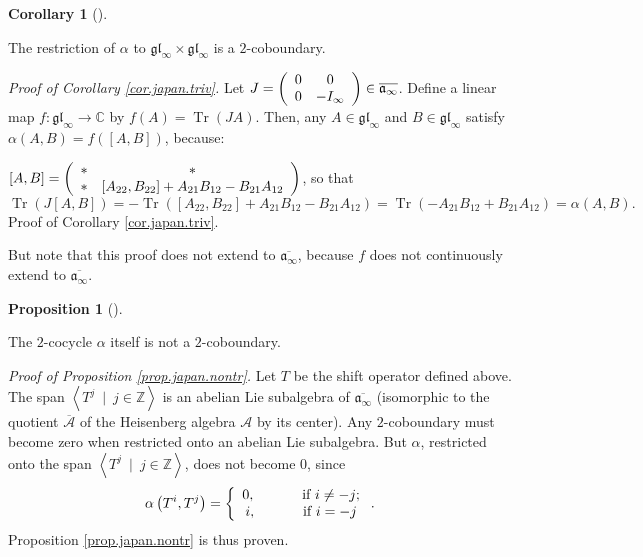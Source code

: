 \documentclass
[numbers=enddot,12pt,final,onecolumn,german,notitlepage]{scrartcl}%
\theoremstyle{definition}
\newtheorem{prop}[theo]{Proposition}
\newenvironment{proposition}[1][]
{\begin{prop}[#1]\begin{leftbar}}
{\end{leftbar}\end{prop}}
\newtheorem{coro}[theo]{Corollary}
\newenvironment{corollary}[1][]
{\begin{coro}[#1]\begin{leftbar}}
{\end{leftbar}\end{coro}}
\begin{document}
\begin{corollary}
\label{cor.japan.triv}The restriction of $\alpha$ to $\mathfrak{gl}_{\infty
}\times\mathfrak{gl}_{\infty}$ is a $2$-coboundary.
\end{corollary}

\textit{Proof of Corollary \ref{cor.japan.triv}.} Let $J=\left(
\begin{array}
[c]{cc}%
0 & 0\\
0 & -I_{\infty}%
\end{array}
\right)  \in\overline{\mathfrak{a}_{\infty}}$. Define a linear map
$f:\mathfrak{gl}_{\infty}\rightarrow\mathbb{C}$ by $f\left(  A\right)
=\operatorname*{Tr}\left(  JA\right)  $. Then, any $A\in\mathfrak{gl}_{\infty
}$ and $B\in\mathfrak{gl}_{\infty}$ satisfy $\alpha\left(  A,B\right)
=f\left(  \left[  A,B\right]  \right)  $, because:

$\left[  A,B\right]  =\left(
\begin{array}
[c]{cc}%
\ast & \ast\\
\ast & \left[  A_{22},B_{22}\right]  +A_{21}B_{12}-B_{21}A_{12}%
\end{array}
\right)  $, so that
\[
\operatorname*{Tr}\left(  J\left[  A,B\right]  \right)  =-\operatorname*{Tr}%
\left(  \left[  A_{22},B_{22}\right]  +A_{21}B_{12}-B_{21}A_{12}\right)
=\operatorname*{Tr}\left(  -A_{21}B_{12}+B_{21}A_{12}\right)  =\alpha\left(
A,B\right)  .
\]
Proof of Corollary \ref{cor.japan.triv}.

But note that this proof does not extend to $\overline{\mathfrak{a}_{\infty}}%
$, because $f$ does not continuously extend to $\overline{\mathfrak{a}%
_{\infty}}$.

\begin{proposition}
\label{prop.japan.nontr}The $2$-cocycle $\alpha$ itself is not a $2$-coboundary.
\end{proposition}

\textit{Proof of Proposition \ref{prop.japan.nontr}.} Let $T$ be the shift
operator defined above. The span $\left\langle T^{j}\ \mid\ j\in
\mathbb{Z}\right\rangle $ is an abelian Lie subalgebra of $\overline
{\mathfrak{a}_{\infty}}$ (isomorphic to the quotient $\overline{\mathcal{A}}$
of the Heisenberg algebra $\mathcal{A}$ by its center). Any $2$-coboundary
must become zero when restricted onto an abelian Lie subalgebra. But $\alpha$,
restricted onto the span $\left\langle T^{j}\ \mid\ j\in\mathbb{Z}%
\right\rangle $, does not become $0$, since%
\[
\alpha\left(  T^{i},T^{j}\right)  =\left\{
\begin{array}
[c]{c}%
0,\ \ \ \ \ \ \ \ \ \ \text{if }i\neq-j;\\
i,\ \ \ \ \ \ \ \ \ \ \text{if }i=-j
\end{array}
\right.  .
\]
Proposition \ref{prop.japan.nontr} is thus proven.
\end{document}
